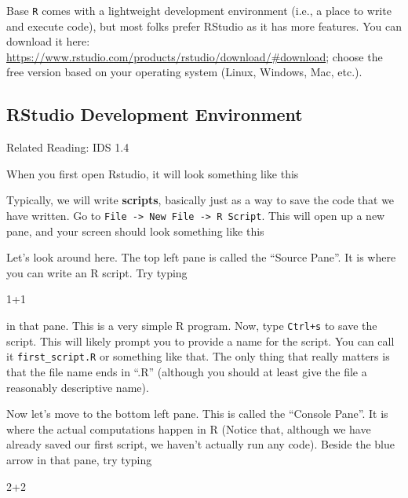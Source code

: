 \documentclass[
  letterpaper,
  DIV=11,
  numbers=noendperiod]{scrreprt}
\newenvironment{Shaded}{\begin{snugshade}}{\end{snugshade}}
\newcommand{\DecValTok}[1]{\textcolor[rgb]{0.68,0.00,0.00}{#1}}
\newcommand{\SpecialCharTok}[1]{\textcolor[rgb]{0.37,0.37,0.37}{#1}}
\begin{document}
Base \texttt{R} comes with a lightweight development environment (i.e.,
a place to write and execute code), but most folks prefer RStudio as it
has more features. You can download it here:
\url{https://www.rstudio.com/products/rstudio/download/\#download};
choose the free version based on your operating system (Linux, Windows,
Mac, etc.).

\subsection{RStudio Development
Environment}\label{rstudio-development-environment}

Related Reading: IDS 1.4

When you first open Rstudio, it will look something like this

Typically, we will write \textbf{scripts}, basically just as a way to
save the code that we have written. Go to
\texttt{File\ -\textgreater{}\ New\ File\ -\textgreater{}\ R\ Script}.
This will open up a new pane, and your screen should look something like
this

Let's look around here. The top left pane is called the ``Source Pane''.
It is where you can write an R script. Try typing

\begin{Shaded}
\begin{Highlighting}[]
\DecValTok{1}\SpecialCharTok{+}\DecValTok{1}
\end{Highlighting}
\end{Shaded}

in that pane. This is a very simple R program. Now, type \texttt{Ctrl+s}
to save the script. This will likely prompt you to provide a name for
the script. You can call it \texttt{first\_script.R} or something like
that. The only thing that really matters is that the file name ends in
``.R'' (although you should at least give the file a reasonably
descriptive name).

Now let's move to the bottom left pane. This is called the ``Console
Pane''. It is where the actual computations happen in R (Notice that,
although we have already saved our first script, we haven't actually run
any code). Beside the blue arrow in that pane, try typing

\begin{Shaded}
\begin{Highlighting}[]
\DecValTok{2}\SpecialCharTok{+}\DecValTok{2}
\end{Highlighting}
\end{Shaded}
\end{document}
